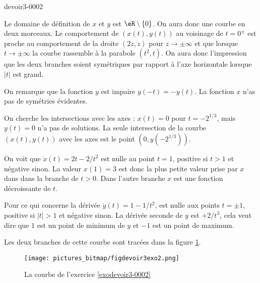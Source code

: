 \begin{corrige}{devoir3-0002}

  Le domaine de définition de $x$ et $y$ est $\eR\setminus\{0\}$. On aura donc une courbe en deux morceaux. Le comportement de $(x(t), y(t))$ au voisinage de $t=0^{\pm}$ est proche au comportement de la droite $(2z, z)$ pour $z\to \pm\infty$ et que lorsque $t\to \pm\infty$ la courbe rassemble à la parabole $(t^2, t)$. On aura donc l'impression que les deux branches soient symétriques par rapport à l'axe horizontale lorsque $|t|$ est grand. 

On remarque que la fonction $y$ est impaire $y(-t)= - y(t)$. La fonction $x$ n'as pas de symétries évidentes. 

On cherche les intersections avec les axes : $x(t)=0$ pour $t= -2^{1/3}$, mais $y(t)=0$ n'a pas de solutions. La seule intersection de la courbe $(x(t),y(t))$ avec les axes est le point  $(0, y(-2^{1/3}))$.   

On voit que $\dot x (t)= 2t -2/t^2$ est nulle au point $t=1$, positive si $t>1$ et négative sinon. La valeur $x(1)=3$ est donc la plus petite valeur prise par $x$ dans dans la branche de $t>0$. Dans l'autre branche $x$ est une fonction décroissante de $t$.   

Pour ce qui concerne la dérivée $\dot y (t) = 1-1/t^2$, est nulle aux points $t=\pm 1$, positive si $|t|>1$ et négative sinon. La dérivée seconde de $y$ est $+2/t^3$, cela veut dire que $1$ est un point de minimum de $y$ et $-1$ est un point de maximum. 

Les deux branches de cette courbe sont tracées dans la figure \ref{figdevoir3exo2}.

\begin{figure}
  \begin{center}
    \texttt{[image: pictures\_bitmap/figdevoir3exo2.png]}

  \caption{La courbe de l'exercice \ref{exodevoir3-0002}}\label{figdevoir3exo2}
  \end{center}
 \end{figure}
\end{corrige}

